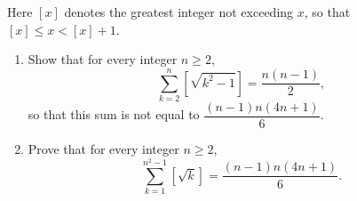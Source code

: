 Here $[x]$ denotes the greatest integer not exceeding $x$, so that $[x]\le x<[x]+1$.
\begin{enumerate}
\item[(a)] Show that for every integer $n\ge2$,
\[\sum_{k=2}^{n}\left[\sqrt{k^2-1}\right]=\dfrac{n(n-1)}{2},\]
so that this sum is not equal to $\dfrac{(n-1)n(4n+1)}{6}$.
\item[(b)] Prove that for every integer $n\ge2$,
\[\sum_{k=1}^{n^2-1}\left[\sqrt{k}\right]=\dfrac{(n-1)n(4n+1)}{6}.\]
\end{enumerate}
